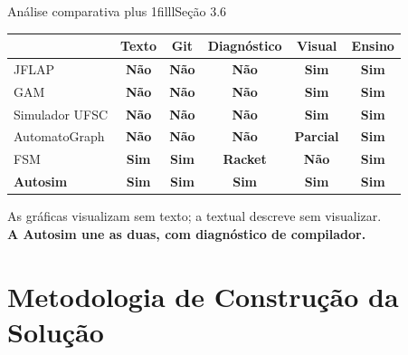 \documentclass[aspectratio=169,12pt]{beamer}
\newcommand{\tsim}{\textcolor{aceita}{\textbf{Sim}}}
\newcommand{\tnao}{\textcolor{rejeita}{\textbf{Não}}}
\newcommand{\tparcial}[1]{\textcolor{parcial}{\textbf{#1}}}
\newcommand{\notexto}[1]{\hskip 0pt plus 1filll{\normalfont\small\color{white!85!acento}#1}}
\begin{document}
\begin{frame}{Análise comparativa\notexto{Seção 3.6}}
  \begin{center}
    \setlength{\tabcolsep}{5pt}
    \begin{tabular}{@{}lccccc@{}}
      \toprule
      & \textbf{Texto} & \textbf{Git} & \textbf{Diagnóstico} & \textbf{Visual} & \textbf{Ensino} \\
      \midrule
      JFLAP          & \tnao & \tnao & \tnao & \tsim & \tsim \\
      GAM            & \tnao & \tnao & \tnao & \tsim & \tsim \\
      Simulador UFSC & \tnao & \tnao & \tnao & \tsim & \tsim \\
      AutomatoGraph  & \tnao & \tnao & \tnao & \tparcial{Parcial} & \tsim \\
      FSM            & \tsim & \tsim & \tparcial{Racket} & \tnao & \tsim \\
      \rowcolor{acento!15}
      \textbf{Autosim} & \tsim & \tsim & \tsim & \tsim & \tsim \\
      \bottomrule
    \end{tabular}
  \end{center}
  \vspace{4pt}
  \begin{center}
    As gráficas visualizam sem texto; a textual descreve sem visualizar.\\
    \textbf{A Autosim une as duas, com diagnóstico de compilador.}
  \end{center}
\end{frame}

\section{Metodologia de Construção da Solução}
\end{document}
